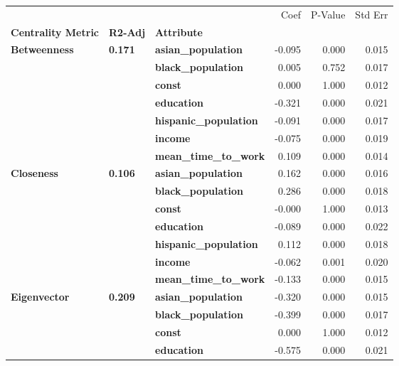 \begin{tabular}{lllrrr}
\toprule
             &       &                   &   Coef &  P-Value &  Std Err \\
\textbf{Centrality Metric} & \textbf{R2-Adj} & \textbf{Attribute} &        &          &          \\
\midrule
\multirow{7}{*}{\textbf{Betweenness}} & \multirow{7}{*}{\textbf{0.171}} & \textbf{asian\_population} & -0.095 &    0.000 &    0.015 \\
             &       & \textbf{black\_population} &  0.005 &    0.752 &    0.017 \\
             &       & \textbf{const} &  0.000 &    1.000 &    0.012 \\
             &       & \textbf{education} & -0.321 &    0.000 &    0.021 \\
             &       & \textbf{hispanic\_population} & -0.091 &    0.000 &    0.017 \\
             &       & \textbf{income} & -0.075 &    0.000 &    0.019 \\
             &       & \textbf{mean\_time\_to\_work} &  0.109 &    0.000 &    0.014 \\
\cline{1-6}
\cline{2-6}
\multirow{7}{*}{\textbf{Closeness}} & \multirow{7}{*}{\textbf{0.106}} & \textbf{asian\_population} &  0.162 &    0.000 &    0.016 \\
             &       & \textbf{black\_population} &  0.286 &    0.000 &    0.018 \\
             &       & \textbf{const} & -0.000 &    1.000 &    0.013 \\
             &       & \textbf{education} & -0.089 &    0.000 &    0.022 \\
             &       & \textbf{hispanic\_population} &  0.112 &    0.000 &    0.018 \\
             &       & \textbf{income} & -0.062 &    0.001 &    0.020 \\
             &       & \textbf{mean\_time\_to\_work} & -0.133 &    0.000 &    0.015 \\
\cline{1-6}
\cline{2-6}
\multirow{7}{*}{\textbf{Eigenvector}} & \multirow{7}{*}{\textbf{0.209}} & \textbf{asian\_population} & -0.320 &    0.000 &    0.015 \\
             &       & \textbf{black\_population} & -0.399 &    0.000 &    0.017 \\
             &       & \textbf{const} &  0.000 &    1.000 &    0.012 \\
             &       & \textbf{education} & -0.575 &    0.000 &    0.021 \\

\end{tabular}
